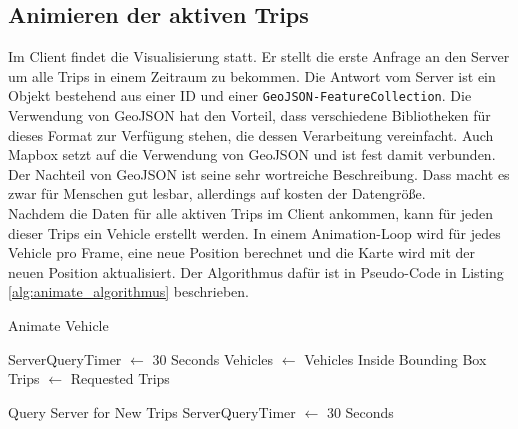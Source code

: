\subsection{Animieren der aktiven Trips}
\label{sub:animieren_der_aktiven_trips}
  Im Client findet die Visualisierung statt. Er stellt die erste Anfrage an den Server um alle Trips in einem Zeitraum zu bekommen. Die Antwort vom Server ist ein Objekt bestehend aus einer ID und einer \texttt{GeoJSON-FeatureCollection}. Die Verwendung von GeoJSON hat den Vorteil, dass verschiedene Bibliotheken für dieses Format zur Verfügung stehen, die dessen Verarbeitung vereinfacht. Auch Mapbox setzt auf die Verwendung von GeoJSON und ist fest damit verbunden. Der Nachteil von GeoJSON ist seine sehr wortreiche Beschreibung. Dass macht es zwar für Menschen gut lesbar, allerdings auf kosten der Datengröße.\\

  Nachdem die Daten für alle aktiven Trips im Client ankommen, kann für jeden dieser Trips ein Vehicle erstellt werden. In einem Animation-Loop wird für jedes Vehicle pro Frame, eine neue Position berechnet und die Karte wird mit der neuen Position aktualisiert. Der Algorithmus dafür ist in Pseudo-Code in Listing \ref{alg:animate_algorithmus} beschrieben. 

  \begin{algorithm}[H]
    \caption{Animate Vehicle}\label{alg:animate_algorithmus}
    \begin{algorithmic}[1]
        \State ServerQueryTimer $\gets$ 30 Seconds
        \State Vehicles $\gets$ Vehicles Inside Bounding Box
        \State Trips $\gets$ Requested Trips
           \EndFor

            \State Query Server for New Trips
            \State ServerQueryTimer $\gets$ 30 Seconds
          \EndIf

          \State {}
        \EndFunction
        
      \EndProcedure
    \end{algorithmic}
  \end{algorithm}

